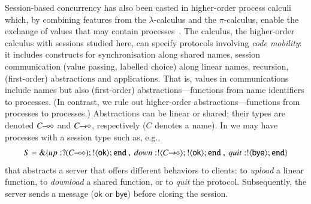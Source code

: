 Session-based concurrency has also been casted in {higher-order} process
calculi which, by combining features from the $\lambda$-calculus and the $\pi$-calculus, 
enable the exchange of values 
that may contain processes~\cite{tlca07,DBLP:journals/jfp/GayV10}. 
The \HOp calculus, 
the higher-order calculus with sessions studied here,
can specify protocols involving \emph{code mobility}: it includes
constructs for 
synchronisation along shared names, 
session communication (value passing, labelled choice) along linear names,
recursion, 
 (first-order) abstractions 
 and applications.
 That is, 
 values in communications include names but also (first-order) abstractions---functions from name identifiers to processes. 
 (In contrast, we rule out higher-order abstractions---functions from processes to processes.)
Abstractions can be linear or shared; their types are  denoted $C\!\! \multimap\!\! \diamond$ and $C\!\! \rightarrow\!\! \diamond$, respectively ($C$ 
denotes a name). In \HOp we may have processes with a 
session type such as, e.g.,
$$S = \btbra{up:\btinp{\lhot{C}}\btout{\mathsf{ok}}\tinact ~ , ~ down:\btout{\shot{C}}\btout{\mathsf{ok}}\tinact ~ , ~quit:\btout{\mathsf{bye}}\tinact}_{}$$
that abstracts a server that offers different behaviors to clients: 
  to \emph{upload} a linear function, %
  to \emph{download} a shared function, %
   or to \emph{quit} the protocol. Subsequently, 
  the server sends a message ($\mathsf{ok}$ or $\mathsf{bye}$) before closing the session.


